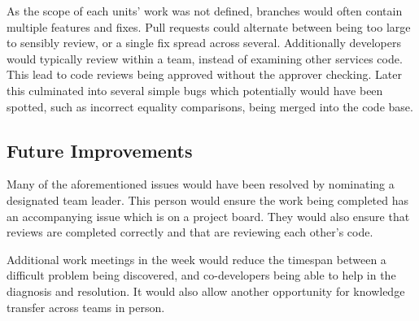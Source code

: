 \par
As the scope of each units' work was not defined, branches would often contain multiple features and fixes. Pull requests could alternate between being too large to sensibly review, or a single fix spread across several. Additionally developers would typically review within a team, instead of examining other services code. This lead to code reviews being approved without the approver checking. Later this culminated into several simple bugs which potentially would have been spotted, such as incorrect equality comparisons, being merged into the code base.

\subsection{Future Improvements}
Many of the aforementioned issues would have been resolved by nominating a designated team leader. This person would ensure the work being completed has an accompanying issue which is on a project board. They would also ensure that reviews are completed correctly and that are reviewing each other's code.

\par
Additional work meetings in the week would reduce the timespan between a difficult problem being discovered, and co-developers being able to help in the diagnosis and resolution. It would also allow another opportunity for knowledge transfer across teams in person.
